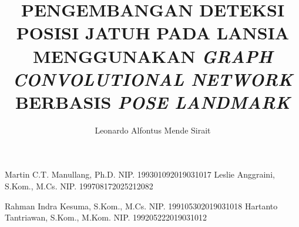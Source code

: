 \documentclass[article]{report} %
\begin{document}

    
    \title{PENGEMBANGAN DETEKSI POSISI JATUH PADA LANSIA MENGGUNAKAN \textit{GRAPH CONVOLUTIONAL NETWORK} BERBASIS \textit{POSE LANDMARK}} 	
    
    \author{Leonardo Alfontus Mende Sirait}		%
	
	\dosbingA%
		{Martin C.T. Manullang, Ph.D.}%
		{NIP. 199301092019031017}				%
	\dosbingB%
		{Leslie Anggraini, S.Kom., M.Cs.}%
		{NIP. 199708172025212082}				%
		
	\pengujiA%
		{Rahman Indra Kesuma, S.Kom., M.Cs.}%
		{NIP. 199105302019031018}				%
	\pengujiB%
		{Hartanto Tantriawan, S.Kom., M.Kom.}%
		{NIP. 199205222019031012}				%

	\sloppy %
    \setcounter{page}{1} %

    \clearpage
    \pagestyle{alternatingstyle}
    
\end{document}
